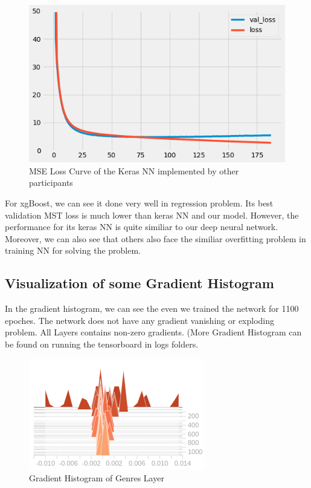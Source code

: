 \documentclass{article}
\begin{document}
\begin{figure}[h]
  \centering
  \includegraphics[scale=0.7]{other_curve.png}
  \caption{MSE Loss Curve of the Keras NN implemented by other participants}
\end{figure}

For xgBoost, we can see it done very well in regression problem. Its best validation MST loss is much lower than keras NN and our model. However, the performance for its keras NN is quite similiar to our deep neural network. Moreover, we can also see that others also face the similiar overfitting problem in training NN for solving the problem.


\subsection{Visualization of some Gradient Histogram }

In the gradient histogram, we can see the even we trained the network for 1100 epoches. The network does not have any gradient vanishing or exploding problem. All Layers contains non-zero gradients. (More Gradient Histogram can be found on running the tensorboard in logs folders.
\begin{figure}[h]
  \centering
  \includegraphics[scale=1]{linear_1.png}
  \caption{Gradient Histogram of Genres Layer}
\end{figure}
\end{document}
